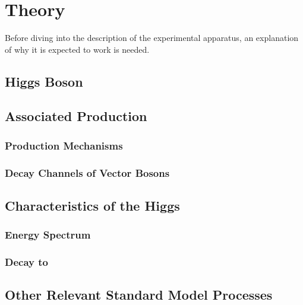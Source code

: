 \chapter{Theory} \label{ch:theory}

Before diving into the description of the experimental apparatus,
an explanation of why it is expected to work is needed.


\section{Higgs Boson}



\section{Associated Production}

\subsection{Production Mechanisms}

\subsection{Decay Channels of Vector Bosons}

\section{Characteristics of the Higgs}

\subsection{Energy Spectrum}

\subsection{Decay to \bb}

\section{Other Relevant Standard Model Processes}
